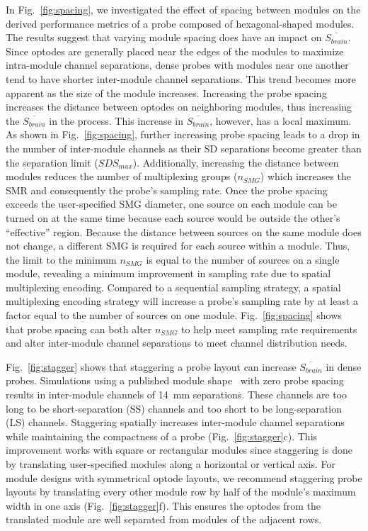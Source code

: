 In Fig.~\ref{fig:spacing}, we investigated the effect of spacing between modules on the derived performance metrics of a probe composed of hexagonal-shaped modules. The results suggest that varying module spacing does have an impact on $\overline{S_{brain}}$. Since optodes are generally placed near the edges of the modules to maximize intra-module channel separations, dense probes with modules near one another tend to have shorter inter-module channel separations. This trend becomes more apparent as the size of the module increases. Increasing the probe spacing increases the distance between optodes on neighboring modules, thus increasing the $\overline{S_{brain}}$ in the process. This increase in $\overline{S_{brain}}$, however, has a local maximum. As shown in Fig.~\ref{fig:spacing}, further increasing probe spacing leads to a drop in the number of inter-module channels as their SD separations become greater than the separation limit ($SDS_{max}$). Additionally, increasing the distance between modules reduces the number of multiplexing groups ($n_{SMG}$) which increases the SMR and consequently the probe's sampling rate. Once the probe spacing exceeds the user-specified SMG diameter, one source on each module can be turned on at the same time because each source would be outside the other's ``effective'' region. Because the distance between sources on the same module does not change, a different SMG is required for each source within a module. Thus, the limit to the minimum $n_{SMG}$ is equal to the number of sources on a single module, revealing a minimum improvement in sampling rate due to spatial multiplexing encoding. Compared to a sequential sampling strategy, a spatial multiplexing encoding strategy will increase a probe's sampling rate by at least a factor equal to the number of sources on one module. Fig.~\ref{fig:spacing} shows that probe spacing can both alter $n_{SMG}$ to help meet sampling rate requirements and alter inter-module channel separations to meet channel distribution needs.

Fig.~\ref{fig:stagger} shows that staggering a probe layout can increase $\overline{S_{brain}}$ in dense probes. Simulations using a published module shape~\cite{Bci2017} with zero probe spacing results in inter-module channels of 14~mm separations. These channels are too long to be short-separation (SS) channels and too short to be long-separation (LS) channels. Staggering spatially increases inter-module channel separations while maintaining the compactness of a probe (Fig.~\ref{fig:stagger}c). This improvement works with square or rectangular modules since staggering is done by translating user-specified modules along a horizontal or vertical axis. For module designs with symmetrical optode layouts, we recommend staggering probe layouts by translating every other module row by half of the module's maximum width in one axis (Fig.~\ref{fig:stagger}f). This ensures the optodes from the translated module are well separated from modules of the adjacent rows.

